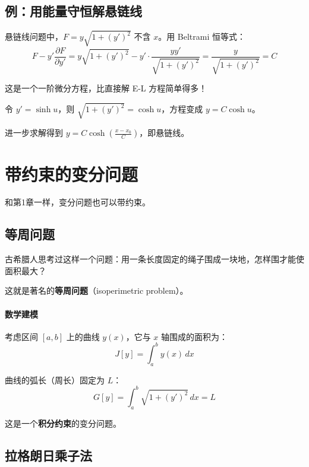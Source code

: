 \subsection{例：用能量守恒解悬链线}

悬链线问题中，$F = y\sqrt{1 + (y')^2}$ 不含 $x$。用 Beltrami 恒等式：
\[
F - y' \frac{\partial F}{\partial y'} = y\sqrt{1+(y')^2} - y' \cdot \frac{yy'}{\sqrt{1+(y')^2}} = \frac{y}{\sqrt{1+(y')^2}} = C
\]

这是一个一阶微分方程，比直接解 E-L 方程简单得多！

令 $y' = \sinh u$，则 $\sqrt{1+(y')^2} = \cosh u$，方程变成 $y = C \cosh u$。

进一步求解得到 $y = C \cosh\left(\frac{x-x_0}{C}\right)$，即悬链线。

\section{带约束的变分问题}

和第1章一样，变分问题也可以带约束。

\subsection{等周问题}

古希腊人思考过这样一个问题：用一条长度固定的绳子围成一块地，怎样围才能使面积最大？

这就是著名的\textbf{等周问题}（isoperimetric problem）。

\paragraph{数学建模}

考虑区间 $[a, b]$ 上的曲线 $y(x)$，它与 $x$ 轴围成的面积为：
\[
J[y] = \int_a^b y(x) \, dx
\]

曲线的弧长（周长）固定为 $L$：
\[
G[y] = \int_a^b \sqrt{1 + (y')^2} \, dx = L
\]

这是一个\textbf{积分约束}的变分问题。

\subsection{拉格朗日乘子法}

